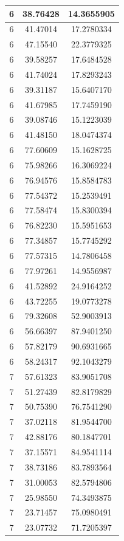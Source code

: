 \documentclass[
]{book}
\begin{document}
\begin{tabular}{c|c|c}
\hline
6 & 38.76428 & 14.3655905\\
\hline
6 & 41.47014 & 17.2780334\\
\hline
6 & 47.15540 & 22.3779325\\
\hline
6 & 39.58257 & 17.6484528\\
\hline
6 & 41.74024 & 17.8293243\\
\hline
6 & 39.31187 & 15.6407170\\
\hline
6 & 41.67985 & 17.7459190\\
\hline
6 & 39.08746 & 15.1223039\\
\hline
6 & 41.48150 & 18.0474374\\
\hline
6 & 77.60609 & 15.1628725\\
\hline
6 & 75.98266 & 16.3069224\\
\hline
6 & 76.94576 & 15.8584783\\
\hline
6 & 77.54372 & 15.2539491\\
\hline
6 & 77.58474 & 15.8300394\\
\hline
6 & 76.82230 & 15.5951653\\
\hline
6 & 77.34857 & 15.7745292\\
\hline
6 & 77.57315 & 14.7806458\\
\hline
6 & 77.97261 & 14.9556987\\
\hline
6 & 41.52892 & 24.9164252\\
\hline
6 & 43.72255 & 19.0773278\\
\hline
6 & 79.32608 & 52.9003913\\
\hline
6 & 56.66397 & 87.9401250\\
\hline
6 & 57.82179 & 90.6931665\\
\hline
6 & 58.24317 & 92.1043279\\
\hline
7 & 57.61323 & 83.9051708\\
\hline
7 & 51.27439 & 82.8179829\\
\hline
7 & 50.75390 & 76.7541290\\
\hline
7 & 37.02118 & 81.9544700\\
\hline
7 & 42.88176 & 80.1847701\\
\hline
7 & 37.15571 & 84.9541114\\
\hline
7 & 38.73186 & 83.7893564\\
\hline
7 & 31.00053 & 82.5794806\\
\hline
7 & 25.98550 & 74.3493875\\
\hline
7 & 23.71457 & 75.0980491\\
\hline
7 & 23.07732 & 71.7205397\\

\end{tabular}
\end{document}
